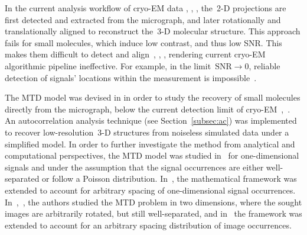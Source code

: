 \documentclass{article}
\newcommand{\rev}[1]{{\color{magenta}{#1}}}
\begin{document}
In the current analysis workflow of \mbox{cryo-EM} data \cite{bendory2020single}, \cite{singer2020computational} \cite{scheres2012relion}, \cite{punjani2017cryosparc}, the~\mbox{2-D} projections are first detected and extracted from the micrograph, and later rotationally and translationally aligned to reconstruct the~\mbox{3-D} molecular structure. This approach fails for small molecules, which induce low contrast, and thus low SNR. This makes them difficult to detect and align~\cite{bendory2018toward}, \cite{singer2020computational} \cite{henderson1995potential}, \cite{aguerrebere2016fundamental}, rendering current \mbox{cryo-EM} algorithmic pipeline ineffective. For example, in the limit~\mbox{$\text{SNR} \rightarrow 0$}, reliable detection of signals' locations within the measurement is impossible~\cite[Proposition~3.1]{bendory2018toward}.

The MTD model was devised in \cite{bendory2018toward} in order to study the recovery of small molecules directly from the micrograph, below the current detection limit of \mbox{cryo-EM}~\cite{henderson1995potential},~\cite{d2021current}. An autocorrelation analysis technique (see Section~\ref{subsec:ac}) was implemented to recover \mbox{low-resolution}~\mbox{3-D} structures from noiseless simulated data under a simplified model. In order to further investigate the method from analytical and computational perspectives, the MTD model was studied in~\cite{bendory2019multi} for one-dimensional signals and under the assumption that the signal occurrences are either \mbox{well-separated} \rev{(as in this paper)} or follow a Poisson distribution. In~\cite{lan2020multi}, the mathematical framework was extended to account for arbitrary spacing of one-dimensional signal occurrences. In~\cite{marshall2020image},~\cite{bendory2021multi}, the authors studied the MTD problem in two dimensions, where the sought images are arbitrarily rotated, but still \mbox{well-separated}, and in~\cite{kreymer2021two} the framework was extended to account for an arbitrary spacing distribution of image occurrences.
\end{document}
